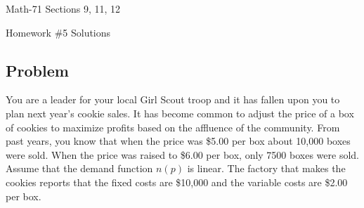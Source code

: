\documentclass[letterpaper,12pt,fleqn]{article}
\begin{document}
\begin{center}
  \large
  Math-71 Sections 9, 11, 12

  \Large
  Homework \#5 Solutions
\end{center}

\subsection*{Problem}

You are a leader for your local Girl Scout troop and it has fallen upon you to plan next year's cookie sales.  It has become
common to adjust the price of a box of cookies to maximize profits based on the affluence of the community.  From past years,
you know that when the price was \$5.00 per box about 10,000 boxes were sold.  When the price was raised to \$6.00 per box,
only 7500 boxes were sold.  Assume that the demand function \(n(p)\) is linear.  The factory that makes the cookies reports
that the fixed costs are \$10,000 and the variable costs are \$2.00 per box.
\end{document}
